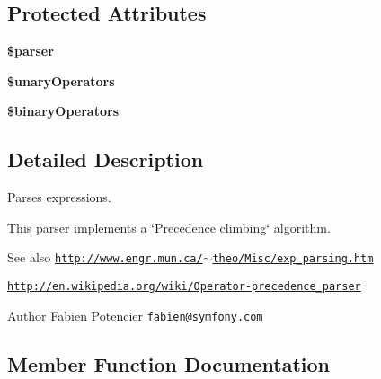 \subsection*{Protected Attributes}
\begin{DoxyCompactItemize}
\item 
{\bfseries \$parser}\hypertarget{classTwig__ExpressionParser_a3a22e0c2a1382fe5b79b4c432c8df9da}{}\label{classTwig__ExpressionParser_a3a22e0c2a1382fe5b79b4c432c8df9da}

\item 
{\bfseries \$unary\+Operators}\hypertarget{classTwig__ExpressionParser_a1e3610b4fb519da9d833943498c8337d}{}\label{classTwig__ExpressionParser_a1e3610b4fb519da9d833943498c8337d}

\item 
{\bfseries \$binary\+Operators}\hypertarget{classTwig__ExpressionParser_a92f4b28c7ee7b2753ecd21a53b7a8db3}{}\label{classTwig__ExpressionParser_a92f4b28c7ee7b2753ecd21a53b7a8db3}

\end{DoxyCompactItemize}


\subsection{Detailed Description}
Parses expressions.

This parser implements a \char`\"{}\+Precedence climbing\char`\"{} algorithm.

\begin{DoxySeeAlso}{See also}
\href{http://www.engr.mun.ca/~theo/Misc/exp_parsing.htm}{\tt http\+://www.\+engr.\+mun.\+ca/$\sim$theo/\+Misc/exp\+\_\+parsing.\+htm} 

\href{http://en.wikipedia.org/wiki/Operator-precedence_parser}{\tt http\+://en.\+wikipedia.\+org/wiki/\+Operator-\/precedence\+\_\+parser}
\end{DoxySeeAlso}
\begin{DoxyAuthor}{Author}
Fabien Potencier \href{mailto:fabien@symfony.com}{\tt fabien@symfony.\+com} 
\end{DoxyAuthor}


\subsection{Member Function Documentation}
